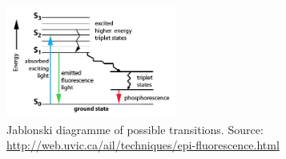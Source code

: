 \documentclass[a4paper]{scrartcl}
\numberwithin{equation}{section}
\numberwithin{figure}{section}
\numberwithin{table}{section}
\begin{document}
\begin{figure}
\centering
\includegraphics[width=0.5\textwidth]{img/Jablonski.jpg}
\caption{\small Jablonski diagramme of possible transitions. \footnotesize Source: \url{http://web.uvic.ca/ail/techniques/epi-fluorescence.html} }
\label{jablonsk}
\end{figure}

\clearpage
 

\end{document}

